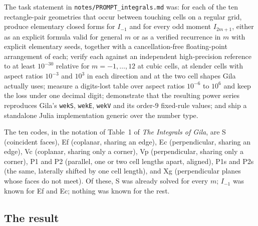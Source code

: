 \documentclass[11pt]{article}
\theoremstyle{remark}
\newcommand{\code}[1]{\texttt{#1}}
\begin{document}
The task statement in \code{notes/PROMPT\_integrals.md} was: for each of the ten
rectangle-pair geometries that occur between touching cells on a regular grid, produce
elementary closed forms for $I_{-1}$ and for every odd moment $I_{2m+1}$, either as an
explicit formula valid for general $m$ or as a verified recurrence in $m$ with explicit
elementary seeds, together with a cancellation-free floating-point arrangement of each;
verify each against an independent high-precision reference to at least $10^{-30}$
relative for $m = -1,\ldots,12$ at cubic cells, at slender cells with aspect ratios
$10^{-3}$ and $10^{3}$ in each direction and at the two cell shapes Gila actually uses;
measure a digits-lost table over aspect ratios $10^{-6}$ to $10^{6}$ and keep the loss
under one decimal digit; demonstrate that the resulting power series reproduces Gila's
\code{wekS}, \code{wekE}, \code{wekV} and its order-9 fixed-rule values; and ship a
standalone Julia implementation generic over the number type.

The ten codes, in the notation of Table~1 of \emph{The Integrals of Gila}, are S
(coincident faces), Ef (coplanar, sharing an edge), Ec (perpendicular, sharing an edge),
Vc (coplanar, sharing only a corner), Vp (perpendicular, sharing only a corner), P1 and P2
(parallel, one or two cell lengths apart, aligned), P1s and P2s (the same, laterally
shifted by one cell length), and Xg (perpendicular planes whose faces do not meet). Of
these, S was already solved for every $m$; $I_{-1}$ was known for Ef and Ec; nothing was
known for the rest.

\subsection{The result}
\end{document}
